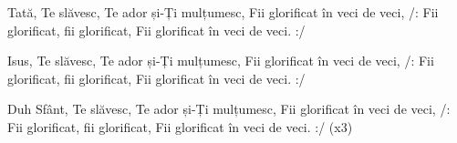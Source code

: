 \beginverse
Tată, Te slăvesc, Te ador și-Ți mulțumesc,
Fii glorificat în veci de veci,
/: Fii glorificat, fii glorificat,
Fii glorificat în veci de veci. :/
\endverse

\beginverse
Isus, Te slăvesc, Te ador și-Ți mulțumesc,
Fii glorificat în veci de veci,
/: Fii glorificat, fii glorificat,
Fii glorificat în veci de veci. :/
\endverse

\beginverse
Duh Sfânt, Te slăvesc, Te ador și-Ți mulțumesc,
Fii glorificat în veci de veci,
/: Fii glorificat, fii glorificat,
Fii glorificat în veci de veci. :/ (x3)
\endverse
\endsong